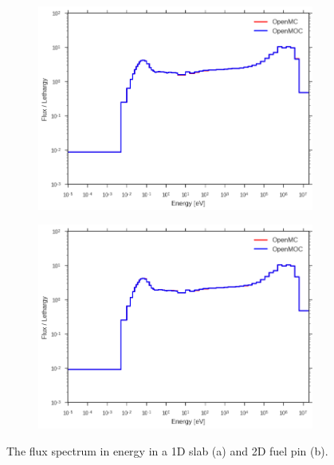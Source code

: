 \begin{figure}[H]
\begin{subfigure}{0.9\textwidth}
  \centering
  \includegraphics[width=\linewidth]{figures/biases/slab/vol-avg-flux}
  \caption{}
\end{subfigure}
\begin{subfigure}{0.9\textwidth}
  \centering
  \includegraphics[width=\linewidth]{figures/biases/pin-cell/vol-avg-flux}
  \caption{}
\end{subfigure}
\caption[Flux spectrum in a slab and pin cell]{The flux spectrum in energy in a 1D slab (a) and 2D fuel pin (b).}
\label{fig:chap5-flux}
\end{figure}

